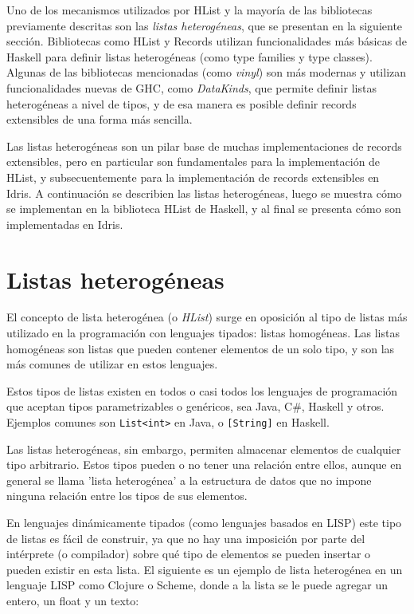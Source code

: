 Uno de los mecanismos utilizados por HList y la mayoría de las bibliotecas previamente descritas son las \textit{listas heterogéneas}, que se presentan en la siguiente sección. Bibliotecas como HList y Records \cite{HaskellRecords} utilizan funcionalidades más básicas de Haskell para definir listas heterogéneas (como type families y type classes). Algunas de las bibliotecas mencionadas (como \textit{vinyl}) son más modernas y utilizan funcionalidades nuevas de GHC, como \textit{DataKinds}, que permite definir listas heterogéneas a nivel de tipos, y de esa manera es posible definir records extensibles de una forma más sencilla.

Las listas heterogéneas son un pilar base de muchas implementaciones de records extensibles, pero en particular son fundamentales para la implementación de HList, y subsecuentemente para la implementación de records extensibles en Idris. A continuación se describien las listas heterogéneas, luego se muestra cómo se implementan en la biblioteca HList de Haskell, y al final se presenta cómo son implementadas en Idris.

\section{Listas heterogéneas}

El concepto de lista heterogénea (o \textit{HList}) surge en oposición al tipo de listas más utilizado en la programación con lenguajes tipados: listas homogéneas. Las listas homogéneas son listas que pueden contener elementos de un solo tipo, y son las más comunes de utilizar en estos lenguajes.

Estos tipos de listas existen en todos o casi todos los lenguajes de programación que aceptan tipos parametrizables o genéricos, sea Java, C\#, Haskell y otros. Ejemplos comunes son \texttt{List<int>} en Java, o \texttt{[String]} en Haskell.

Las listas heterogéneas, sin embargo, permiten almacenar elementos de cualquier tipo arbitrario. Estos tipos pueden o no tener una relación entre ellos, aunque en general se llama 'lista heterogénea' a la estructura de datos que no impone ninguna relación entre los tipos de sus elementos.

En lenguajes dinámicamente tipados (como lenguajes basados en LISP) este tipo de listas es fácil de construir, ya que no hay una imposición por parte del intérprete (o compilador) sobre qué tipo de elementos se pueden insertar o pueden existir en esta lista. El siguiente es un ejemplo de lista heterogénea en un lenguaje LISP como Clojure o Scheme, donde a la lista se le puede agregar un entero, un float y un texto:

